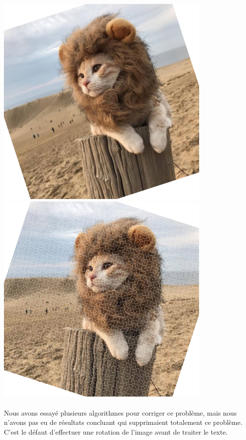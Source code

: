\documentclass{article}
\begin{document}
\begin{center}
    \includegraphics[scale=0.3]{exampleRotateSimbaForFisch}
    \hspace*{1cm}
    \includegraphics[scale=0.3]{rotationPixelsManquants}
\end{center}

\paragraph{}
Nous avons essayé plusieurs algorithmes pour corriger ce problème, mais nous n'avons pas eu de résultats concluant qui supprimaient totalement ce problème. C'est le défaut d'effectuer une rotation de l'image avant de traiter le texte.
\end{document}

